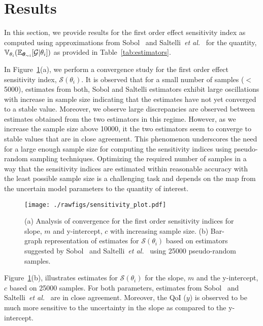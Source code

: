 \section{Results}

In this section, we provide results for the first order effect sensitivity index as computed using approximations
from Sobol~\cite{Sobol:1990} and Saltelli~\emph{et al.}~\cite{Saltelli:2010} for the quantity,
$\operatorname{\mathbb{V}}_{\theta_{i}}(\operatorname{\mathbb{E}}_{\bm \theta_{\sim i}}[\mathcal{G}\vert\theta_{i}])$ as provided in Table~\ref{tab:estimators}.

In Figure~\ref{fig:sensitivity}(a), we perform a convergence study for the first order effect sensitivity index,
$\mathcal{S}(\theta_{i})$. It is observed that for a small number of samples ($<$ 5000), estimates from both,
Sobol and Saltelli estimators exhibit large oscillations with increase in sample size indicating that the
estimates have not yet converged to a stable value. Moreover, we observe large discrepancies are observed between
estimates obtained from the two estimators in this regime. However, as we increase the sample size above 10000, it
the two estimators seem to converge to stable values that are in close agreement. This phenomenon underscores the
need for a large enough sample size for computing the sensitivity indices using pseudo-random sampling techniques.
Optimizing the required number of samples in a way that the sensitivity indices are estimated within  reasonable
accuracy with the least possible sample size is a challenging task and depends on the map from the uncertain
model parameters to the quantity of interest.

\begin{figure}[htbp]
\begin{center}
\texttt{[image: ./rawfigs/sensitivity\_plot.pdf]}
\end{center}
\caption{(a) Analysis of convergence for the first order sensitivity indices for slope, $m$ and
y-intercept, $c$ with increasing sample size. (b) Bar-graph representation of estimates for $\mathcal{S}(\theta_{i})$
based on estimators suggested by Sobol~\cite{Sobol:1990} and Saltelli~\emph{et al.}~\cite{Saltelli:2010} using 25000
pseudo-random samples.}
\label{fig:sensitivity}
\end{figure}

Figure~\ref{fig:sensitivity}(b), illustrates estimates for $\mathcal{S}(\theta_{i})$ for the slope, $m$ and the
y-intercept, $c$ based on 25000 samples. For both parameters, estimates from Sobol~\cite{Sobol:1990} and
Saltelli~\emph{et al.}~\cite{Saltelli:2010} are in close agreement. Moreover, the QoI ($y$) is observed
to be much more sensitive to the uncertainty in the slope as compared to the y-intercept.

